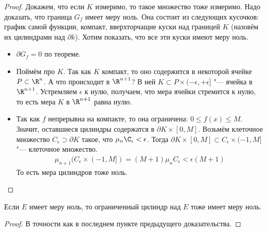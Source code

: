 \begin{proof}
	Докажем, что если $K$ измеримо, то такое множество тоже измеримо.
	Надо доказать, что граница $G_f$ имеет меру ноль.
	Она состоит из следующих кусочков: график самой функции, компакт, вверхторчащие куски над границей $K$ (назовём их цилиндрами над $\partial k$).
	Хотим показать, что все эти куски имеют меру ноль.
	\begin{itemize}
	\item $\partial G_f = 0$ по теореме.
	\item
		Поймём про $K$.
		Так как $K$ компакт, то оно содержится в некоторой ячейке $P \subset \R^n$.
		А что происходит в $\R^{n+1}$?
		В ней $K \subset P \times (-\epsilon, +\epsilon]$ "--- ячейка в $\R^{n+1}$.
		Устремляем $\epsilon$ к нулю, получаем, что мера ячейки стремится к нулю, то есть мера $K$ в $\R^{n+1}$ равна нулю.
	\item
		Так как $f$ непрерывна на компакте, то она ограничена: $0 \le f(x) \le M$.
		Значит, оставшиеся цилиндры содержатся в $\partial K \times [0,M]$.
		Возьмём клеточное множество $C_{\epsilon} \supset \partial K$ такое, что $\mu_n \C_{\epsilon} < \epsilon$.
		Тогда $\partial K \times [0,M] \subset C_\epsilon \times (-1,M]$ "--- клеточное множество.
		\begin{gather*}
			\mu_{n+1} (C_\epsilon \times (-1, M]) = (M+1)\mu_nC_\epsilon < \epsilon(M+1)
		\end{gather*}
		То есть мера цилиндров тоже ноль.
	\end{itemize}
\end{proof}
\begin{conseq}
	Если $E$ имеет меру ноль, то ограниченный цилиндр над $E$ тоже имеет меру ноль.
\end{conseq}
\begin{proof}
	В точности как в последнем пункте предыдущего доказательства.
\end{proof}

